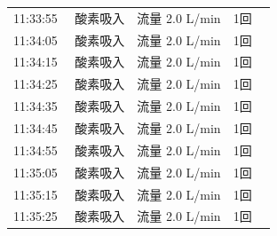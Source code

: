 \documentclass[UTF8,10pt,a4paper,fontset=fandol]{ctexart}
\begin{document}
\begin{minipage}[t]{0.48\linewidth}
\begin{tabular}{@{}p{0.22\linewidth}p{0.72\linewidth}@{}}
11:33:55 & 酸素吸入　流量 2.0 L/min　1回\\
11:34:05 & 酸素吸入　流量 2.0 L/min　1回\\
11:34:15 & 酸素吸入　流量 2.0 L/min　1回\\
11:34:25 & 酸素吸入　流量 2.0 L/min　1回\\
11:34:35 & 酸素吸入　流量 2.0 L/min　1回\\
11:34:45 & 酸素吸入　流量 2.0 L/min　1回\\
11:34:55 & 酸素吸入　流量 2.0 L/min　1回\\
11:35:05 & 酸素吸入　流量 2.0 L/min　1回\\
11:35:15 & 酸素吸入　流量 2.0 L/min　1回\\
11:35:25 & 酸素吸入　流量 2.0 L/min　1回\\
\end{tabular}
\end{minipage}
\hfill
\end{document}
